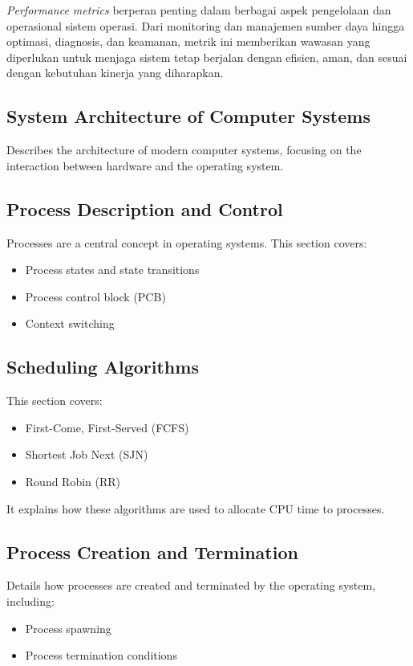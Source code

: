 \documentclass[12pt]{article}
\begin{document}
\hspace*{1cm} \textit{Performance metrics} berperan penting dalam berbagai aspek pengelolaan dan operasional sistem operasi. Dari monitoring dan manajemen sumber daya hingga optimasi, diagnosis, dan keamanan, metrik ini memberikan wawasan yang diperlukan untuk menjaga sistem tetap berjalan dengan efisien, aman, dan sesuai dengan kebutuhan kinerja yang diharapkan.

\subsection{System Architecture of Computer Systems}
Describes the architecture of modern computer systems, focusing on the interaction between hardware and the operating system.

\subsection{Process Description and Control}
Processes are a central concept in operating systems. This section covers:
\begin{itemize}
    \item Process states and state transitions
    \item Process control block (PCB)
    \item Context switching
\end{itemize}

\subsection{Scheduling Algorithms}
This section covers:
\begin{itemize}
    \item First-Come, First-Served (FCFS)
    \item Shortest Job Next (SJN)
    \item Round Robin (RR)
\end{itemize}
It explains how these algorithms are used to allocate CPU time to processes.

\subsection{Process Creation and Termination}
Details how processes are created and terminated by the operating system, including:
\begin{itemize}
    \item Process spawning
    \item Process termination conditions
\end{itemize}
\end{document}

